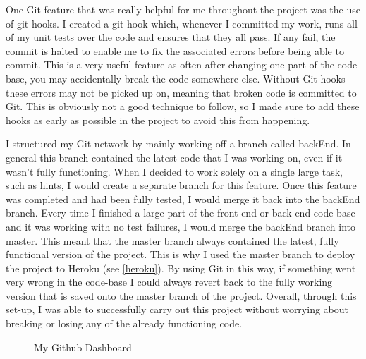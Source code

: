 One Git feature that was really helpful for me throughout the project was the use of git-hooks. I created a git-hook which, whenever I committed my work, runs all of my unit tests over the code and ensures that they all pass. If any fail, the commit is halted to enable me to fix the associated errors before being able to commit. This is a very useful feature as often after changing one part of the code-base, you may accidentally break the code somewhere else. Without Git hooks these errors may not be picked up on, meaning that broken code is committed to Git.  This is obviously not a good technique to follow, so I made sure to add these hooks as early as possible in the project to avoid this from happening.

I structured my Git network by mainly working off a branch called backEnd. In general this branch contained the latest code that I was working on, even if it wasn't fully functioning. When I decided to work solely on a single large task, such as hints, I would create a separate branch for this feature. Once this feature was completed and had been fully tested, I would merge it back into the backEnd branch. Every time I finished a large part of the front-end or back-end code-base and it was working with no test failures, I would merge the backEnd branch into master. This meant that the master branch always contained the latest, fully functional version of the project. This is why I used the master branch to deploy the project to Heroku (see \ref{heroku}). By using Git in this way,  if something went very wrong in the code-base I could always revert back to the fully working version that is saved onto the master branch of the project. Overall, through this set-up, I was able to successfully carry out this project without worrying about breaking or losing any of the already functioning code.


\begin{figure}[!ht]
	\centering
	\caption{My Github Dashboard}
\end{figure}

